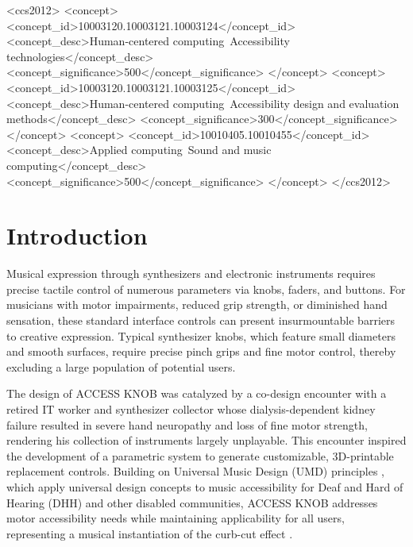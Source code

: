 \documentclass[manuscript,screen,review,anonymous]{acmart}
\begin{document}
\begin{CCSXML}
<ccs2012>
<concept>
<concept_id>10003120.10003121.10003124</concept_id>
<concept_desc>Human-centered computing~Accessibility technologies</concept_desc>
<concept_significance>500</concept_significance>
</concept>
<concept>
<concept_id>10003120.10003121.10003125</concept_id>
<concept_desc>Human-centered computing~Accessibility design and evaluation methods</concept_desc>
<concept_significance>300</concept_significance>
</concept>
<concept>
<concept_id>10010405.10010455</concept_id>
<concept_desc>Applied computing~Sound and music computing</concept_desc>
<concept_significance>500</concept_significance>
</concept>
</ccs2012>
\end{CCSXML}



\maketitle

\section{Introduction}

Musical expression through synthesizers and electronic instruments requires precise tactile control of numerous parameters via knobs, faders, and buttons. For musicians with motor impairments, reduced grip strength, or diminished hand sensation, these standard interface controls can present insurmountable barriers to creative expression. Typical synthesizer knobs, which feature small diameters and smooth surfaces, require precise pinch grips and fine motor control, thereby excluding a large population of potential users.

The design of ACCESS KNOB was catalyzed by a co-design encounter with a retired IT worker and synthesizer collector whose dialysis-dependent kidney failure resulted in severe hand neuropathy and loss of fine motor strength, rendering his collection of instruments largely unplayable. This encounter inspired the development of a parametric system to generate customizable, 3D-printable replacement controls. Building on Universal Music Design (UMD) principles \cite{hergert2024gestolumina,cavdir2024sonic}, which apply universal design concepts to music accessibility for Deaf and Hard of Hearing (DHH) and other disabled communities, ACCESS KNOB addresses motor accessibility needs while maintaining applicability for all users, representing a musical instantiation of the curb-cut effect \cite{treviranus2014}.
\end{document}

